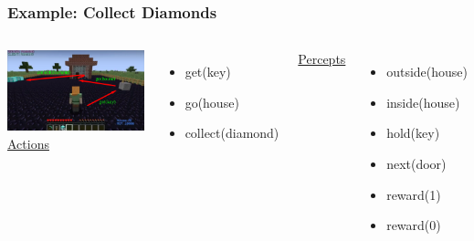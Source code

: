 \documentclass[aspectratio=169]{beamer}
\begin{document}
\begin{frame}
  \frametitle{Example: Collect Diamonds}
  \begin{columns}
    \column{4.4in}
    \includegraphics[scale=0.33]{pictures/minecraft-arrows.png}
    \column{1.7in}
    \underline{Actions}
      \begin{itemize}
      \item get(key)
      \item go(house)
      \item collect(diamond)
      \end{itemize}
    \underline{Percepts}
      \begin{itemize}
      \item outside(house)
      \item inside(house)
      \item hold(key)
      \item next(door)
      \item reward(1)
      \item reward(0)
      \end{itemize}
  \end{columns}
\end{frame}
\end{document}

